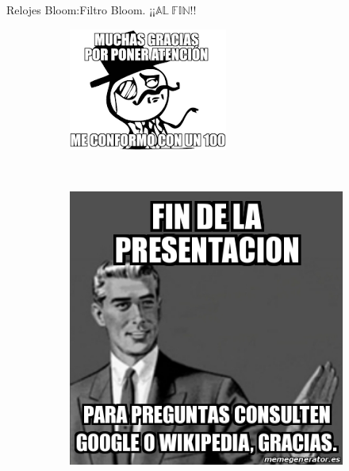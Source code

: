 \begin{frame}[fragile]{Relojes Bloom:}{Filtro Bloom.}
  \center ¡¡$\mathbb{AL\ FIN!!}$
  
  \begin{figure}
    \centering
    \begin{subfigure}[b]{0.4\textwidth}
      \includegraphics[width=\textwidth]{./Imagenes/Agradecimientos}
    \end{subfigure}
    ~ %
    \begin{subfigure}[b]{0.3\textwidth}
        \includegraphics[width=\textwidth]{./Imagenes/Fin}
    \end{subfigure}
    \end{figure}
\end{frame}
